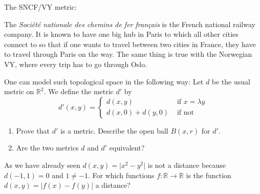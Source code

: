\documentclass[11pt]{article}%
\begin{document}
\begin{Exercise} [title=**]
	The SNCF/VY metric:
	 
	The \emph{ Société nationale des chemins de fer français} is the French national railway company. It is known to have one big hub in Paris to which all other cities connect to so that if one wants to travel between two cities in France, they have to travel through Paris on the way. The same thing is true with the Norwegian VY, where every trip has to go through Oslo.
	
	One can model such topological space in the following way:
	Let $d$ be the usual metric on $\mathbb{R}^2$. We define the metric $d'$ by 
	$$
	d'(x,y)=\begin{cases}d(x,y)& \text{ if } x=\lambda y\\ d(x,0)+d(y,0) &\text{ if not } \end{cases}
	$$ 
	\begin{enumerate}
		\item Prove that $d'$ is a metric. Describe the open ball $B(x,r)$ for $d'$.
		\item Are the two metrics $d$ and $d'$ equivalent?
	\end{enumerate}
\end{Exercise}

\begin{Exercise}[title=*]
	As we have already seen $d(x,y)=\lvert x^2-y^2 \rvert$ is not a distance because $d(-1,1)=0$ and $1\neq-1$. For which functions $f:\mathbb R\rightarrow\mathbb R$ is the function $d(x,y)=\lvert f(x)-f(y) \rvert$ a distance?
\end{Exercise}
\end{document}
